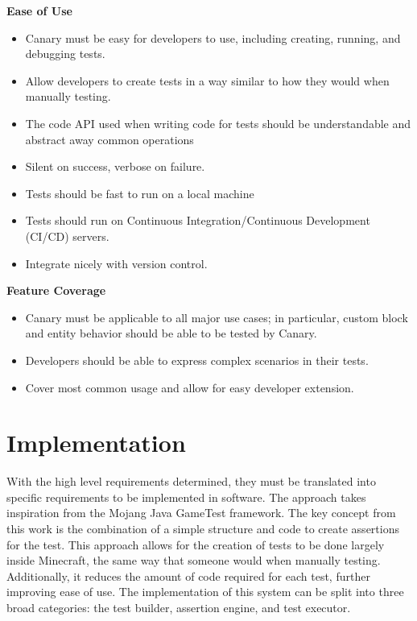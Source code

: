 \documentclass{article}
\begin{document}
\begin{onehalfspacing}
\textbf{Ease of Use}

\begin{itemize}
\item
  Canary must be easy for developers to use, including creating,
  running, and debugging tests.
\item
  Allow developers to create tests in a way similar to how they would
  when manually testing.
\item
  The code API used when writing code for tests should be understandable
  and abstract away common operations
\item
  Silent on success, verbose on failure.
\item
  Tests should be fast to run on a local machine
\item
  Tests should run on Continuous Integration/Continuous Development
  (CI/CD) servers.
\item
  Integrate nicely with version control.
\end{itemize}

\textbf{Feature Coverage}

\begin{itemize}
\item
  Canary must be applicable to all major use cases; in particular,
  custom block and entity behavior should be able to be tested by
  Canary.
\item
  Developers should be able to express complex scenarios in their tests.
\item
  Cover most common usage and allow for easy developer extension.
\end{itemize}

\section{Implementation}

With the high level requirements determined, they must be translated
into specific requirements to be implemented in software. The approach
takes inspiration from the Mojang Java GameTest framework. The key
concept from this work is the combination of a simple structure and code
to create assertions for the test. This approach allows for the creation
of tests to be done largely inside Minecraft, the same way that someone
would when manually testing. Additionally, it reduces the amount of code
required for each test, further improving ease of use. The
implementation of this system can be split into three broad categories:
the test builder, assertion engine, and test executor.


\end{onehalfspacing}
\end{document}

